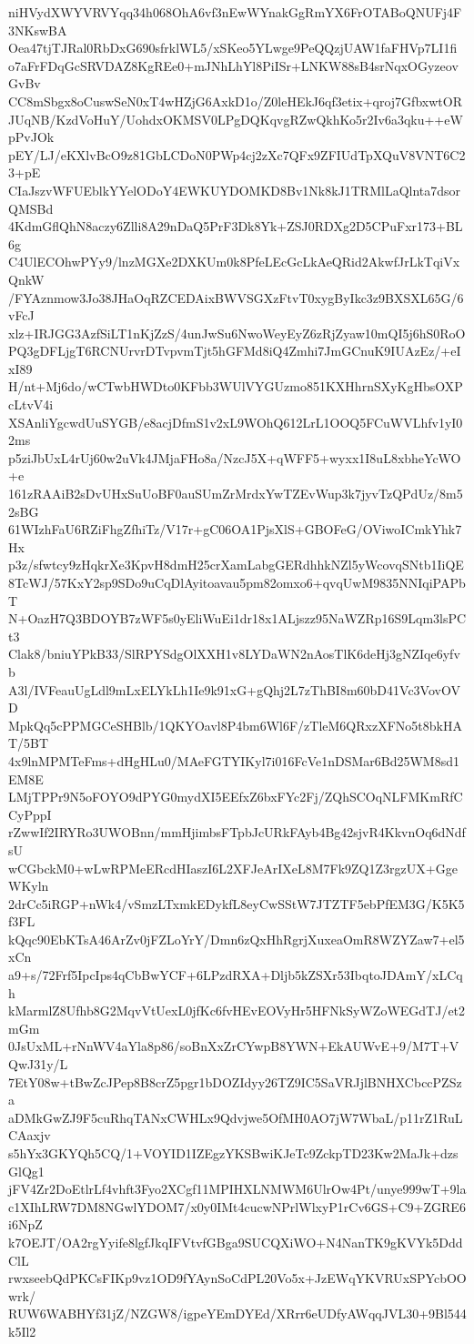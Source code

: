 niHVydXWYVRVYqq34h068OhA6vf3nEwWYnakGgRmYX6FrOTABoQNUFj4F3NKswBA
Oea47tjTJRal0RbDxG690sfrklWL5/xSKeo5YLwge9PeQQzjUAW1faFHVp7LI1fi
o7aFrFDqGcSRVDAZ8KgREe0+mJNhLhYl8PiISr+LNKW88sB4srNqxOGyzeovGvBv
CC8mSbgx8oCuswSeN0xT4wHZjG6AxkD1o/Z0leHEkJ6qf3etix+qroj7GfbxwtOR
JUqNB/KzdVoHuY/UohdxOKMSV0LPgDQKqvgRZwQkhKo5r2Iv6a3qku++eWpPvJOk
pEY/LJ/eKXlvBcO9z81GbLCDoN0PWp4cj2zXc7QFx9ZFIUdTpXQuV8VNT6C23+pE
CIaJszvWFUEblkYYelODoY4EWKUYDOMKD8Bv1Nk8kJ1TRMlLaQlnta7dsorQMSBd
4KdmGflQhN8aczy6Zlli8A29nDaQ5PrF3Dk8Yk+ZSJ0RDXg2D5CPuFxr173+BL6g
C4UlECOhwPYy9/lnzMGXe2DXKUm0k8PfeLEcGcLkAeQRid2AkwfJrLkTqiVxQnkW
/FYAznmow3Jo38JHaOqRZCEDAixBWVSGXzFtvT0xygByIkc3z9BXSXL65G/6vFcJ
xlz+IRJGG3AzfSiLT1nKjZzS/4unJwSu6NwoWeyEyZ6zRjZyaw10mQI5j6hS0RoO
PQ3gDFLjgT6RCNUrvrDTvpvmTjt5hGFMd8iQ4Zmhi7JmGCnuK9IUAzEz/+eIxI89
H/nt+Mj6do/wCTwbHWDto0KFbb3WUlVYGUzmo851KXHhrnSXyKgHbsOXPcLtvV4i
XSAnliYgcwdUuSYGB/e8acjDfmS1v2xL9WOhQ612LrL1OOQ5FCuWVLhfv1yI02ms
p5ziJbUxL4rUj60w2uVk4JMjaFHo8a/NzcJ5X+qWFF5+wyxx1I8uL8xbheYcWO+e
161zRAAiB2sDvUHxSuUoBF0auSUmZrMrdxYwTZEvWup3k7jyvTzQPdUz/8m52sBG
61WIzhFaU6RZiFhgZfhiTz/V17r+gC06OA1PjsXlS+GBOFeG/OViwoICmkYhk7Hx
p3z/sfwtcy9zHqkrXe3KpvH8dmH25crXamLabgGERdhhkNZl5yWcovqSNtb1IiQE
8TcWJ/57KxY2sp9SDo9uCqDlAyitoavau5pm82omxo6+qvqUwM9835NNIqiPAPbT
N+OazH7Q3BDOYB7zWF5s0yEliWuEi1dr18x1ALjszz95NaWZRp16S9Lqm3lsPCt3
Clak8/bniuYPkB33/SlRPYSdgOlXXH1v8LYDaWN2nAosTlK6deHj3gNZIqe6yfvb
A3l/IVFeauUgLdl9mLxELYkLh1Ie9k91xG+gQhj2L7zThBI8m60bD41Vc3VovOVD
MpkQq5cPPMGCeSHBlb/1QKYOavl8P4bm6Wl6F/zTleM6QRxzXFNo5t8bkHAT/5BT
4x9lnMPMTeFms+dHgHLu0/MAeFGTYIKyl7i016FcVe1nDSMar6Bd25WM8sd1EM8E
LMjTPPr9N5oFOYO9dPYG0mydXI5EEfxZ6bxFYc2Fj/ZQhSCOqNLFMKmRfCCyPppI
rZwwIf2IRYRo3UWOBnn/mmHjimbsFTpbJcURkFAyb4Bg42sjvR4KkvnOq6dNdfsU
wCGbckM0+wLwRPMeERcdHIaszI6L2XFJeArIXeL8M7Fk9ZQ1Z3rgzUX+GgeWKyln
2drCc5iRGP+nWk4/vSmzLTxmkEDykfL8eyCwSStW7JTZTF5ebPfEM3G/K5K5f3FL
kQqc90EbKTsA46ArZv0jFZLoYrY/Dmn6zQxHhRgrjXuxeaOmR8WZYZaw7+el5xCn
a9+s/72Frf5IpcIps4qCbBwYCF+6LPzdRXA+Dljb5kZSXr53IbqtoJDAmY/xLCqh
kMarmlZ8Ufhb8G2MqvVtUexL0jfKc6fvHEvEOVyHr5HFNkSyWZoWEGdTJ/et2mGm
0JsUxML+rNnWV4aYla8p86/soBnXxZrCYwpB8YWN+EkAUWvE+9/M7T+VQwJ31y/L
7EtY08w+tBwZcJPep8B8crZ5pgr1bDOZIdyy26TZ9IC5SaVRJjlBNHXCbccPZSza
aDMkGwZJ9F5cuRhqTANxCWHLx9Qdvjwe5OfMH0AO7jW7WbaL/p11rZ1RuLCAaxjv
s5hYx3GKYQh5CQ/1+VOYID1IZEgzYKSBwiKJeTc9ZckpTD23Kw2MaJk+dzsGlQg1
jFV4Zr2DoEtlrLf4vhft3Fyo2XCgf11MPIHXLNMWM6UlrOw4Pt/unye999wT+9la
c1XIhLRW7DM8NGwlYDOM7/x0y0IMt4cucwNPrlWlxyP1rCv6GS+C9+ZGRE6i6NpZ
k7OEJT/OA2rgYyife8lgfJkqIFVtvfGBga9SUCQXiWO+N4NanTK9gKVYk5DddClL
rwxseebQdPKCsFIKp9vz1OD9fYAynSoCdPL20Vo5x+JzEWqYKVRUxSPYcbOOwrk/
RUW6WABHYf31jZ/NZGW8/igpeYEmDYEd/XRrr6eUDfyAWqqJVL30+9Bl544k5Il2
